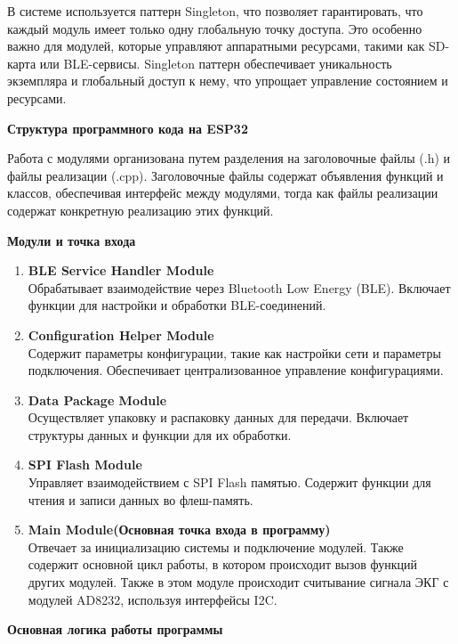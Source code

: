 \documentclass[12pt, russian]{extarticle}
\begin{document}
\begin{spacing}{1.5}
В системе используется паттерн Singleton, что позволяет гарантировать, что каждый модуль имеет только одну глобальную точку доступа. Это особенно важно для модулей, которые управляют аппаратными ресурсами, такими как SD-карта или BLE-сервисы. Singleton паттерн обеспечивает уникальность экземпляра и глобальный доступ к нему, что упрощает управление состоянием и ресурсами.

\par \noindent \textbf{Структура программного кода на ESP32}

Работа с модулями организована путем разделения на заголовочные файлы (.h) и файлы реализации (.cpp). Заголовочные файлы содержат объявления функций и классов, обеспечивая интерфейс между модулями, тогда как файлы реализации содержат конкретную реализацию этих функций.

\par \noindent \textbf{Модули и точка входа}

\begin{enumerate}
    \item \textbf{BLE Service Handler Module} \\
        Обрабатывает взаимодействие через Bluetooth Low Energy (BLE). Включает функции для настройки и обработки BLE-соединений.
    \item \textbf{Configuration Helper Module} \\
        Содержит параметры конфигурации, такие как настройки сети и параметры подключения. Обеспечивает централизованное управление конфигурациями.
    \item \textbf{Data Package Module} \\
        Осуществляет упаковку и распаковку данных для передачи. Включает структуры данных и функции для их обработки.
    \item \textbf{SPI Flash Module} \\
        Управляет взаимодействием с SPI Flash памятью. Содержит функции для чтения и записи данных во флеш-память.
    \item \textbf{Main Module(Основная точка входа в программу)} \\
        Отвечает за инициализацию системы и подключение модулей. Также содержит основной цикл работы, в котором происходит вызов функций других модулей. Также в этом модуле происходит считывание сигнала ЭКГ с модулей AD8232, используя интерфейсы I2C.
\end{enumerate}

\par \noindent \textbf{Основная логика работы программы}


\end{spacing}
\end{document}
